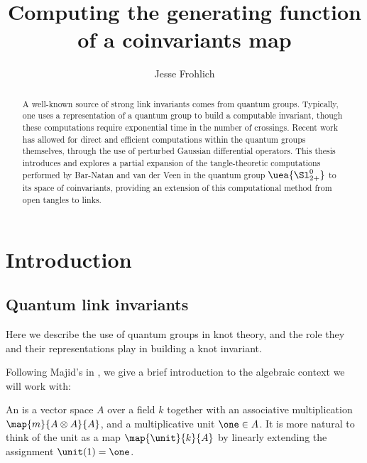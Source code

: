 \documentclass{article}
\title{Computing the generating function of a coinvariants map}
\author{Jesse Frohlich}
\begin{document}
\maketitle

\begin{abstract}
        A well-known source of strong link invariants comes from quantum groups.
        Typically, one uses a representation of a quantum group to build a
        computable invariant, though these computations require exponential time
        in the number of crossings. Recent work has allowed for direct and
        efficient computations within the quantum groups themselves, through the
        use of perturbed Gaussian differential operators. This thesis introduces
        and explores a partial expansion of the tangle-theoretic computations
        performed by Bar-Natan and van der Veen \cite{BV} in the quantum group
        $\uea{\Sl_{2+}^0}$ to its space of coinvariants, providing an extension
        of this computational method from open tangles to links.

\end{abstract}

\newpage

\tableofcontents

\section{Introduction}

\subsection{Quantum link invariants}
Here we describe the use of quantum groups in knot theory, and the role they and
their representations play in building a knot invariant.

Following Majid's in \cite{SM}, we give a brief introduction to the algebraic
context we will work with:

\begin{definition}[algebra]
  An  is a vector space $A$ over a field $k$ together with an
  associative multiplication $\map {m} {A \otimes A} {A}$, and a multiplicative
  unit $\one\in A$. It is more natural to think of the unit as a  map
  $\map{\unit}{k}{A}$ by linearly extending the assignment $\unit(1) = \one$.
\end{definition}
\end{document}
